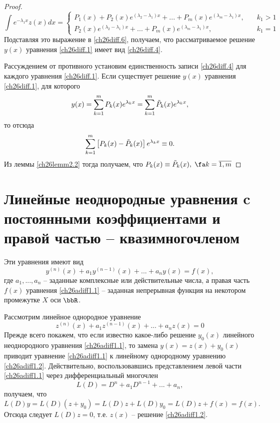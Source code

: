 \begin{proof}
$$
\int e^{-\lambda_1x}z(x)dx = \begin{cases}
P_1(x)+P_2(x)e^{(\lambda_2-\lambda_1)x}+...+P_m(x)e^{(\lambda_m-\lambda_1)x},\quad &k_1>1\\
P_2(x)e^{(\lambda_2-\lambda_1)x}+...+P_m(x)e^{(\lambda_m-\lambda_1)x},\quad &k_1=1
\end{cases}
$$
Подставляя это выражение в \eqref{ch26diff.6}, получаем, что рассматриваемое решение $y(x)$ уравнения \eqref{ch26diff.1} имеет вид \eqref{ch26diff.4}.

Рассуждением от противного установим единственность записи \eqref{ch26diff.4} для каждого уравнения \eqref{ch26diff.1}. Если существует решение $y(x)$ уравнения \eqref{ch26diff.1}, для которого
$$
y(x)=\sum_{k=1}^{m}\limits P_k(x)e^{\lambda_kx}=\sum_{k=1}^{m}\limits \tilde{P}_k(x)e^{\lambda_kx},
$$
то отсюда
$$
\sum_{k=1}^{m}\limits\left[P_k(x)-\tilde{P}_k(x)\right]e^{\lambda_kx}\equiv 0.
$$
Из леммы \ref{ch26lemm2.2} тогда получаем, что $P_k(x)\equiv\tilde{P}_k(x),\; \fa k= \overline{1,m}$
\end{proof}

\section{Линейные неоднородные уравнения c постоянными коэффициентами и правой частью -- квазимногочленом}
Эти уравнения имеют вид
\begin{equation} \label{ch26adiff1.1}
y^{(n)}(x)+a_1y^{(n-1)}(x)+...+a_ny(x)=f(x),
\end{equation}
где $a_1,...,a_n$ -- заданные комплексные или действительные числа, а правая часть $f(x)$ уравнения \eqref{ch26adiff1.1} -- заданная непрерывная функция на некотором промежутке $X$ оси $\bbR$.

Рассмотрим линейное однородное уравнение
\begin{equation}\label{ch26adiff1.2}
z^{(n)}(x)+a_1z^{(n-1)}(x)+...+a_nz(x)=0
\end{equation}
Прежде всего покажем, что если известно какое-либо решение $y_0(x)$ линейного неоднородного уравнения \eqref{ch26adiff1.1}, то замена $y(x)=z(x)+y_0(x)$ приводит уравнение \eqref{ch26adiff1.1} к линейному однородному уравнению \eqref{ch26adiff1.2}. Действительно, воспользовавшись представлением левой части \eqref{ch26adiff1.1} через дифференциальный многочлен
\begin{equation}\label{ch26adiff1.3}
L(D)=D^n+a_1D^{n-1}+...+a_n,
\end{equation}
получаем, что
$$
L(D)y=L(D)(z+y_0)=L(D)z+L(D)y_0=L(D)z+f(x)=f(x).
$$
Отсюда следует $L(D)z=0$, т.е. $z(x)$ -- решение \eqref{ch26adiff1.2}.

